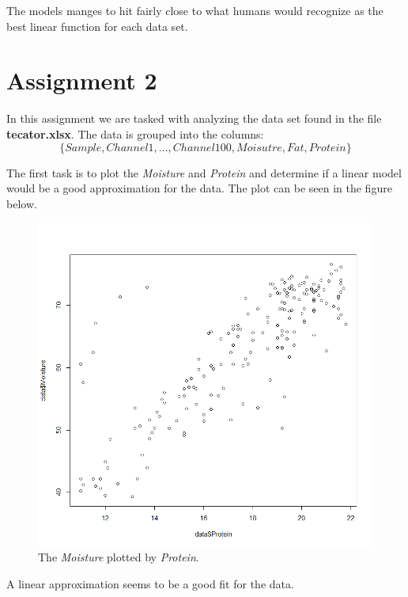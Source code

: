 \documentclass[a4paper,12pt]{article}
\begin{document}
The models manges to hit fairly close to what humans would recognize as the best linear function for each data set.

\section{Assignment 2}

In this assignment we are tasked with analyzing the data set found in the file \textbf{tecator.xlsx}. The data is grouped into the columns: 
\begin{equation}
\{ Sample, Channel 1, ... , Channel 100, Moisutre, Fat, Protein \}
\end{equation}

The first task is to plot the \textit{Moisture} and \textit{Protein} and determine if a linear model would be a good approximation for the data. The plot can be seen in the figure below.

\begin{figure}[H]
\centering
\begin{minipage}[]{0.5\textwidth}
  \includegraphics[width=\textwidth]{figures/Lab2A2_data_plot.png}  
  \caption{The \textit{Moisture} plotted by \textit{Protein}.\label{fig:data plot} }
 \end{minipage}
\end{figure}

A linear approximation seems to be a good fit for the data.
\end{document}
